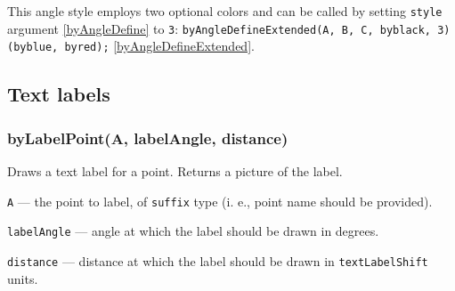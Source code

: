 \documentclass{ltxdoc}
\begin{document}
This angle style employs two optional colors and can be called by setting \texttt{style} argument \ref{byAngleDefine} to \texttt{3}: \texttt{byAngleDefineExtended(A, B, C, byblack, 3)(byblue, byred);} \ref{byAngleDefineExtended}.







\subsection{Text labels}


\subsubsection{byLabelPoint(A, labelAngle, distance)}\label{byLabelPoint}
Draws a text label for a point. Returns a picture of the label.
	
	\texttt{A} — the point to label, of \texttt{suffix} type (i. e., point name should be provided).
	
	\texttt{labelAngle} — angle at which the label should be drawn in degrees.
	
	\texttt{distance} — distance at which the label should be drawn in \texttt{textLabelShift} units.
\end{document}
